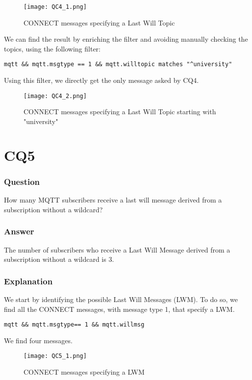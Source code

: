 \begin{figure}[H]
    \centering
    \texttt{[image: QC4\_1.png]}
    \caption{CONNECT messages specifying a Last Will Topic}
\end{figure}

We can find the result by enriching the filter and avoiding manually checking the topics, using the following filter:
\begin{verbatim}
mqtt && mqtt.msgtype == 1 && mqtt.willtopic matches "^university"
\end{verbatim}
Using this filter, we directly get the only message asked by CQ4.

\begin{figure}[H]
    \centering
    \texttt{[image: QC4\_2.png]}
    \caption{CONNECT messages specifying a Last Will Topic starting with "university"}
\end{figure}

\section{CQ5}
\subsubsection{Question}
How many MQTT subscribers receive a last will message derived from a subscription without a wildcard?

\subsubsection{Answer}
The number of subscribers who receive a Last Will Message derived from a subscription without a wildcard is 3.

\subsubsection{Explanation}
We start by identifying the possible Last Will Messages (LWM). To do so, we find all the CONNECT messages, with message type 1, that specify a LWM.
\begin{verbatim}
mqtt && mqtt.msgtype== 1 && mqtt.willmsg
\end{verbatim}

We find four messages.
\begin{figure}[H]
    \centering
    \texttt{[image: QC5\_1.png]}
    \caption{CONNECT messages specifying a LWM}
\end{figure}

